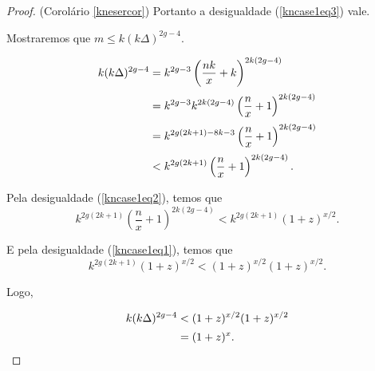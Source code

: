 \begin{proof}{(Corolário \ref{knesercor})}
Portanto a desigualdade (\ref{kncase1eq3}) vale.

Mostraremos que $m \leq k(k\Delta)^{2g-4}$.


\begin{equation*}
\setlength{\jot}{5pt}
\begin{aligned}
k(k\Delta)^{2g-4} & = k^{2g-3}\left(\frac{nk}{x}+k\right)^{2k(2g-4)} \\
 & = k^{2g-3}k^{2k(2g-4)}\left(\frac{n}{x}+1\right)^{2k(2g-4)} \\
 & = k^{2g(2k+1) - 8k - 3}\left(\frac{n}{x}+1\right)^{2k(2g-4)}\\
 & < k^{2g(2k+1)}\left(\frac{n}{x}+1\right)^{2k(2g-4)}.
\end{aligned}
\end{equation*}


Pela desigualdade (\ref{kncase1eq2}), temos que \[k^{2g(2k+1)}\left(\frac{n}{x}+1\right)^{2k(2g-4)}< k^{2g(2k+1)}\left(1+z\right)^{x/2}.\]

E pela desigualdade (\ref{kncase1eq1}), temos que \[k^{2g(2k+1)}\left(1+z\right)^{x/2} < (1+z)^{x/2}(1+z)^{x/2}.\]

Logo,

\begin{equation*}
\setlength{\jot}{5pt}
\begin{aligned}
k(k\Delta)^{2g-4} & < (1+z)^{x/2}(1+z)^{x/2} \\
& = (1+z)^x.
\end{aligned}
\end{equation*}


\end{proof}

